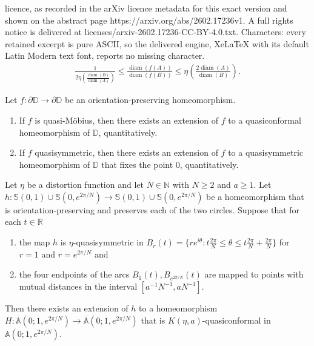 \documentclass[10pt,a4paper]{amsart}
\DeclareMathOperator{\diam}{diam}
\newcommand{\D}{\mathbb D}
\newcommand{\N}{\mathbb N}
\newcommand{\R}{\mathbb R}
\renewcommand{\bar}{\overline}
\begin{document}
licence, as recorded in the arXiv licence metadata for this exact version and shown on the abstract page https://arxiv.org/abs/2602.17236v1. A full rights notice is delivered at licenses/arxiv-2602.17236-CC-BY-4.0.txt. Characters: every retained excerpt is pure ASCII, so the delivered engine, XeLaTeX with its default Latin Modern text font, reports no missing character.
\begin{align}\label{definition:qs}
\frac{1}{2\eta\left( \frac{\diam (B)}{\diam (A)}\right)} \leq \frac{\diam (f(A))}{\diam (f(B))}\leq \eta\left( \frac{2\diam (A)}{\diam (B)}\right).
\end{align}

\begin{corollary}\label{corollary:beurling_ahlfors}
Let $f\colon \partial \D\to \partial \D$ be an orientation-preserving homeomorphism.
\begin{enumerate}[label=\normalfont(\arabic*)]
\item\label{corollary:beurling_ahlfors:1} If $f$ is quasi-M\"obius, then there exists an extension of $f$ to a quasiconformal homeomorphism of $\D$, quantitatively.
\item\label{corollary:beurling_ahlfors:2} If $f$ quasisymmetric, then there exists an extension of $f$ to a quasisymmetric homeomorphism of $\D$ that fixes the point $0$, quantitatively.
\end{enumerate}
\end{corollary}

\begin{proposition}\label{theorem:extension_annulus}
Let $\eta$ be a distortion function and let $N\in \N$ with $N\geq 2$ and $a\geq 1$. Let $h\colon  \mathbb S(0,1)\cup \mathbb S(0,e^{2\pi/N}) \to \mathbb S(0,1)\cup \mathbb S(0,e^{2\pi/N}) $ be a homeomorphism that is orientation-pre\-serving and preserves each of the two circles. Suppose that for each $t\in \R$
\begin{enumerate}[label=\normalfont(\arabic*)]
\item the map $h$ is $\eta$-quasisymmetric in $B_r(t)=\{re^{i\theta}: t \frac{2\pi}{N}\leq \theta\leq t\frac{2\pi}{N}+ \frac{2\pi}{N}\}$ for $r=1$ and $r=e^{2\pi/N}$ and
\item the four endpoints of the arcs $B_1(t), B_{e^{2\pi/N}}(t)$ are mapped to points with mutual distances in the interval $[a^{-1} N^{-1},a N^{-1}]$. 
\end{enumerate}
Then there exists an extension of $h$ to a homeomorphism $H\colon \bar{\mathbb A}(0;1,e^{2\pi/N})\to \bar{\mathbb A}(0;1,e^{2\pi/N})$ that is $K(\eta,a)$-quasiconformal in ${\mathbb A}(0;1,e^{2\pi/N})$.
\end{proposition}
\end{document}
